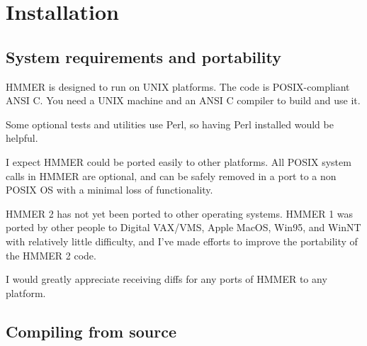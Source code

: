 \chapter{Installation}

\section{System requirements and portability}

HMMER is designed to run on UNIX platforms. The code is
POSIX-compliant ANSI C.  You need a UNIX machine and an ANSI C
compiler to build and use it.

Some optional tests and utilities use Perl, so having Perl installed
would be helpful.

I expect HMMER could be ported easily to other platforms. All POSIX
system calls in HMMER are optional, and can be safely removed in a
port to a non POSIX OS with a minimal loss of functionality. 

HMMER 2 has not yet been ported to other operating systems.  HMMER 1
was ported by other people to Digital VAX/VMS, Apple MacOS, Win95, and
WinNT with relatively little difficulty, and I've made efforts to
improve the portability of the HMMER 2 code.

I would greatly appreciate receiving diffs for any ports of HMMER to
any platform.

\section{Compiling from source}

